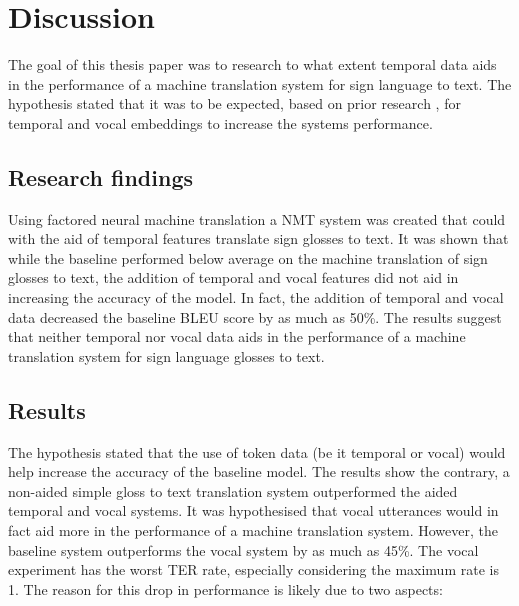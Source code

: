 \break
\section{Discussion}

The goal of this thesis paper was to research to what extent temporal data aids in the performance of a machine translation system for sign language to text. The hypothesis stated that it was to be expected, based on prior research \cite{konradoffentliches}, for temporal and vocal embeddings to increase the systems performance.

\subsection{Research findings}

Using factored neural machine translation a NMT system was created that could with the aid of temporal features translate sign glosses to text. It was shown that while the baseline performed below average \cite{vaswani2017attention} on the machine translation of sign glosses to text, the addition of temporal and vocal features did not aid in increasing the accuracy of the model. In fact, the addition of temporal and vocal data decreased the baseline BLEU score by as much as 50\%. The results suggest that neither temporal nor vocal data aids in the performance of a machine translation system for sign language glosses to text.

\subsection{Results}

The hypothesis stated that the use of token data (be it temporal or vocal) would help increase the accuracy of the baseline model. The results show the contrary, a non-aided simple gloss to text translation system outperformed the aided temporal and vocal systems. It was hypothesised that vocal utterances would in fact aid more in the performance of a machine translation system. However, the baseline system outperforms the vocal system by as much as 45\%. The vocal experiment has the worst TER rate, especially considering the maximum rate is 1. The reason for this drop in performance is likely due to two aspects: 

